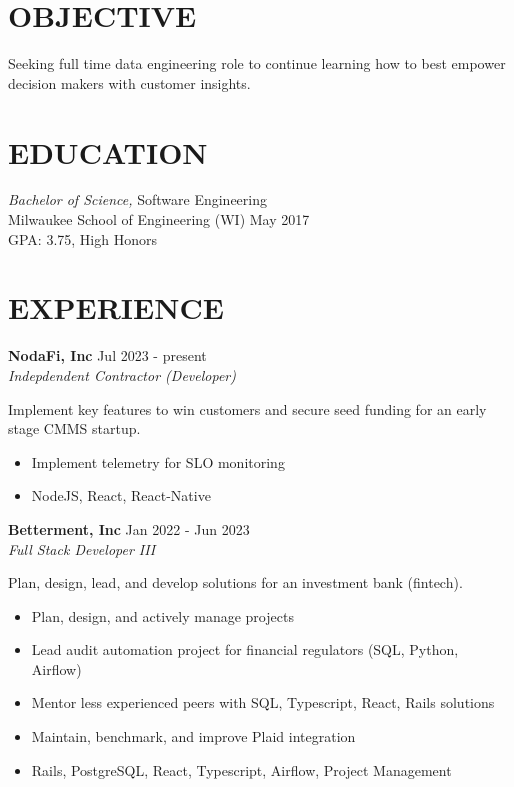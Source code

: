 \documentclass[line,margin]{res}
\begin{document}

\address{austin.dev@protonmail.com | (414) 334-4061}

\begin{resume}

\section{OBJECTIVE}
Seeking full time data engineering role to continue learning how to best empower decision makers with customer insights.

\section{EDUCATION}
{\sl Bachelor of Science,} Software Engineering \\
Milwaukee School of Engineering (WI) \hfill May 2017 \\
GPA: 3.75, High Honors \\

\section{EXPERIENCE}

\textbf{NodaFi, Inc} \hfill Jul 2023 - present \\
{\sl Indepdendent Contractor (Developer)}

Implement key features to win customers and secure seed funding for an early stage CMMS startup.

\begin{itemize}
\item Implement telemetry for SLO monitoring
\item NodeJS, React, React-Native
\end{itemize}

\textbf{Betterment, Inc} \hfill Jan 2022 - Jun 2023 \\
{\sl Full Stack Developer III}

Plan, design, lead, and develop solutions for an investment bank (fintech).

\begin{itemize}
\item Plan, design, and actively manage projects
\item Lead audit automation project for financial regulators (SQL, Python, Airflow)
\item Mentor less experienced peers with SQL, Typescript, React, Rails solutions
\item Maintain, benchmark, and improve Plaid integration
\item Rails, PostgreSQL, React, Typescript, Airflow, Project Management
\end{itemize}


\end{resume}
\end{document}

